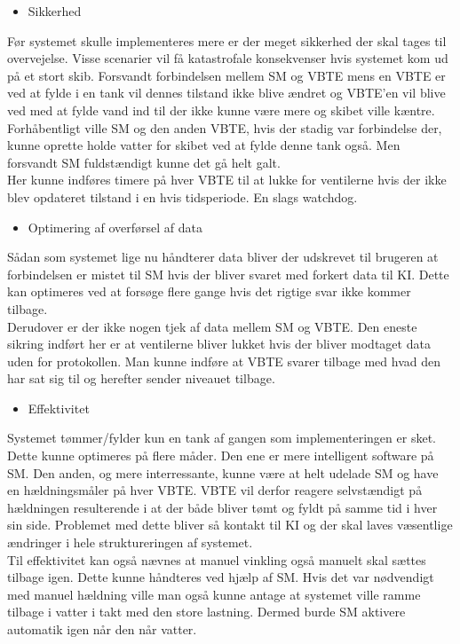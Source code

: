 \begin{large}\begin{itemize}
\item Sikkerhed
\end{itemize}\end{large}
Før systemet skulle implementeres mere er der meget sikkerhed der skal tages til overvejelse. Visse scenarier vil få katastrofale konsekvenser hvis systemet kom ud på et stort skib. Forsvandt forbindelsen mellem SM og VBTE mens en VBTE er ved at fylde i en tank vil dennes tilstand ikke blive ændret og VBTE'en vil blive ved med at fylde vand ind til der ikke kunne være mere og skibet ville kæntre. Forhåbentligt ville SM og den anden VBTE, hvis der stadig var forbindelse der, kunne oprette holde vatter for skibet ved at fylde denne tank også. Men forsvandt SM fuldstændigt kunne det gå helt galt.\\
Her kunne indføres timere på hver VBTE til at lukke for ventilerne hvis der ikke blev opdateret tilstand i en hvis tidsperiode. En slags watchdog.
\begin{large}\begin{itemize}
\item Optimering af overførsel af data
\end{itemize}\end{large}
Sådan som systemet lige nu håndterer data bliver der udskrevet til brugeren at forbindelsen er mistet til SM hvis der bliver svaret med forkert data til KI. Dette kan optimeres ved at forsøge flere gange hvis det rigtige svar ikke kommer tilbage. \\
Derudover er der ikke nogen tjek af data mellem SM og VBTE. Den eneste sikring indført her er at ventilerne bliver lukket hvis der bliver modtaget data uden for protokollen. Man kunne indføre at VBTE svarer tilbage med hvad den har sat sig til og herefter sender niveauet tilbage.
\begin{large}\begin{itemize}
\item Effektivitet
\end{itemize}\end{large}
Systemet tømmer/fylder kun en tank af gangen som implementeringen er sket. Dette kunne optimeres på flere måder. Den ene er mere intelligent software på SM. Den anden, og mere interressante, kunne være at helt udelade SM og have en hældningsmåler på hver VBTE. VBTE vil derfor reagere selvstændigt på hældningen resulterende i at der både bliver tømt og fyldt på samme tid i hver sin side. Problemet med dette bliver så kontakt til KI og der skal laves væsentlige ændringer i hele struktureringen af systemet.\\
Til effektivitet kan også nævnes at manuel vinkling også manuelt skal sættes tilbage igen. Dette kunne håndteres ved hjælp af SM. Hvis det var nødvendigt med manuel hældning ville man også kunne antage at systemet ville ramme tilbage i vatter i takt med den store lastning. Dermed burde SM aktivere automatik igen når den når vatter.